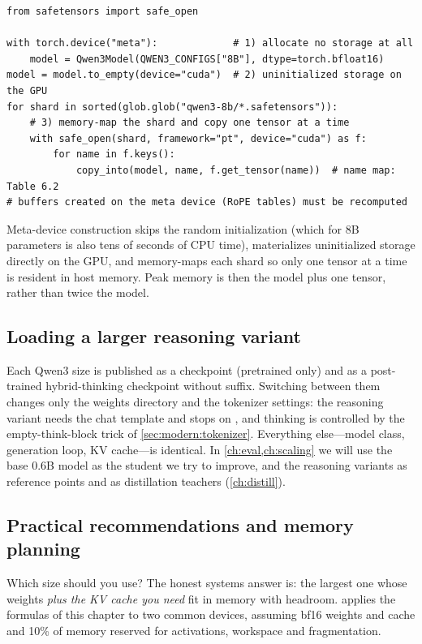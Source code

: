 \begin{lstlisting}[caption={Memory-frugal loading: meta-device construction and per-shard copy.},label={lst:modern:meta}]
from safetensors import safe_open

with torch.device("meta"):             # 1) allocate no storage at all
    model = Qwen3Model(QWEN3_CONFIGS["8B"], dtype=torch.bfloat16)
model = model.to_empty(device="cuda")  # 2) uninitialized storage on the GPU
for shard in sorted(glob.glob("qwen3-8b/*.safetensors")):
    # 3) memory-map the shard and copy one tensor at a time
    with safe_open(shard, framework="pt", device="cuda") as f:
        for name in f.keys():
            copy_into(model, name, f.get_tensor(name))  # name map: Table 6.2
# buffers created on the meta device (RoPE tables) must be recomputed
\end{lstlisting}

Meta-device construction skips the random initialization (which for 8B parameters is also tens of
seconds of CPU time),  materializes uninitialized storage directly on the GPU, and
 memory-maps each shard so only one tensor at a time is resident in host memory.
Peak memory is then the model plus one tensor, rather than twice the model.

\subsection{Loading a larger reasoning variant}
Each Qwen3 size is published as a  checkpoint (pretrained only) and as a post-trained
hybrid-thinking checkpoint without suffix. Switching between them changes only the weights directory
and the tokenizer settings: the reasoning variant needs the chat template and stops on
, and thinking is controlled by the empty-think-block trick of
\cref{sec:modern:tokenizer}. Everything else---model class, generation loop, KV cache---is identical.
In \cref{ch:eval,ch:scaling} we will use the base 0.6B model as the student we try to improve, and the
reasoning variants as reference points and as distillation teachers (\cref{ch:distill}).

\subsection{Practical recommendations and memory planning}
Which size should you use? The honest systems answer is: the largest one whose weights \emph{plus the
KV cache you need} fit in memory with headroom.  applies the formulas of this
chapter to two common devices, assuming bf16 weights and cache and 10\% of memory reserved for
activations, workspace and fragmentation.

